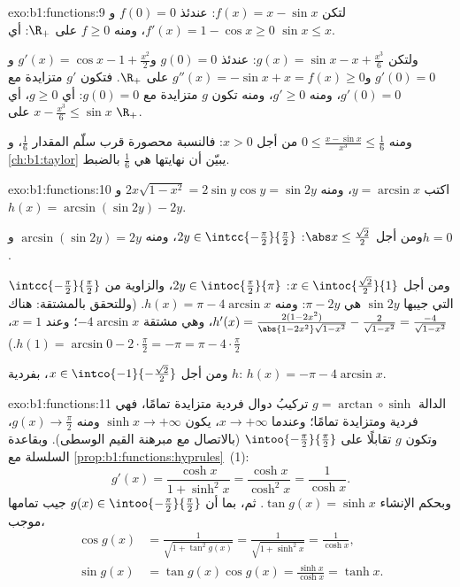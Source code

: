 \begin{solution}{exo:b1:functions:9}
لتكن $f(x) = x - \sin x$: عندئذ $f(0) = 0$ و$f'(x) = 1 - \cos x \geq 0$،
ومنه $f \geq 0$ على $\R_+$: أي $\sin x \leq x$.

ولتكن $g(x) = \sin x - x + \frac{x^3}{6}$: عندئذ $g(0) = 0$ و$g'(x) = \cos x -
1 + \frac{x^2}{2}$ و $g'(0) = 0$ و$g''(x) = -\sin x + x = f(x) \geq 0$
على $\R_+$. فتكون $g'$ متزايدة مع $g'(0) = 0$، ومنه $g' \geq 0$،
ومنه تكون $g$ متزايدة مع $g(0) = 0$: أي $g \geq 0$، أي $x -
\frac{x^3}{6} \leq \sin x$ على $\R_+$.

ومنه $0 \leq \frac{x - \sin x}{x^3} \leq \frac 16$ من أجل $x >
0$: فالنسبة محصورة قرب سلّم المقدار $\frac16$، و
\cref{ch:b1:taylor} يبيّن أن نهايتها هي $\frac 16$ بالضبط.
\end{solution}

\begin{solution}{exo:b1:functions:10}
اكتب $y = \arcsin x$، ومنه $2x\sqrt{1 - x^2} = 2\sin y\cos y = \sin
2y$ و$h(x) = \arcsin(\sin 2y) - 2y$.

ومن أجل $\abs x \leq \frac{\sqrt 2}{2}$: $2y \in
\intcc{-\frac\pi2}{\frac\pi2}$، ومنه $\arcsin(\sin 2y) = 2y$ و$h =
0$.

ومن أجل $x \in \intoc{\frac{\sqrt 2}{2}}{1}$: $2y \in
\intoc{\frac\pi2}{\pi}$، والزاوية من
$\intcc{-\frac\pi2}{\frac\pi2}$ التي جيبها $\sin 2y$ هي $\pi - 2y$:
ومنه $h(x) = \pi - 4\arcsin x$. (وللتحقق بالمشتقة: هناك
$h'(x) = \frac{2(1 - 2x^2)}{\abs{1 - 2x^2}\sqrt{1 - x^2}} -
\frac{2}{\sqrt{1-x^2}} = \frac{-4}{\sqrt{1 - x^2}}$، وهي مشتقة
$-4\arcsin x$؛ وعند $x = 1$، $h(1) = \arcsin 0 - 2\cdot\frac\pi2
= -\pi = \pi - 4\cdot\frac\pi2$.)

ومن أجل $x \in \intco{-1}{-\frac{\sqrt 2}{2}}$، بفردية $h$:
$h(x) = -\pi - 4\arcsin x$.
\end{solution}

\begin{solution}{exo:b1:functions:11}
الدالة $g = \arctan \circ \sinh$ تركيبُ دوال فردية متزايدة
تمامًا، فهي فردية ومتزايدة تمامًا؛ وعندما $x \to
+\infty$، يكون $\sinh x \to +\infty$ ومنه $g(x) \to \frac\pi2$، وتكون $g$
تقابلًا على $\intoo{-\frac\pi2}{\frac\pi2}$ (بالاتصال مع مبرهنة
القيم الوسطى). وبقاعدة السلسلة مع
\cref{prop:b1:functions:hyprules}~(1):
\[
g'(x) = \frac{\cosh x}{1 + \sinh^2 x} = \frac{\cosh x}{\cosh^2 x}
= \frac{1}{\cosh x} .
\]
وبحكم الإنشاء $\tan g(x) = \sinh x$. ثم، بما أن $g(x) \in
\intoo{-\frac\pi2}{\frac\pi2}$ جيب تمامها موجب،
\begin{align*}
\cos g(x) &= \frac{1}{\sqrt{1 + \tan^2 g(x)}}
= \frac{1}{\sqrt{1 + \sinh^2 x}} = \frac{1}{\cosh x},\\
\sin g(x) &= \tan g(x) \cos g(x) = \frac{\sinh x}{\cosh x} = \tanh x .
\end{align*}
\end{solution}

